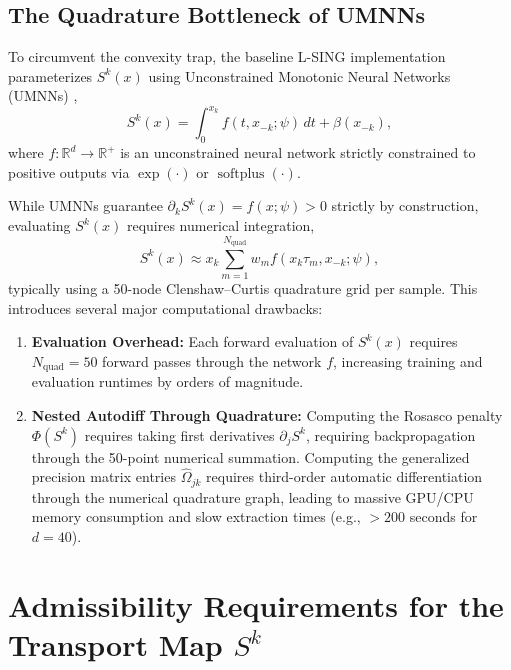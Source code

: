 \documentclass[11pt,a4paper]{article}
\theoremstyle{plain}
\theoremstyle{definition}
\theoremstyle{remark}
\begin{document}
\subsection{The Quadrature Bottleneck of UMNNs}

To circumvent the convexity trap, the baseline L-SING implementation parameterizes $S^k(x)$ using Unconstrained Monotonic Neural Networks (UMNNs) \cite{wehenkel2019unconstrained},
\begin{equation}
    S^k(x) = \int_0^{x_k} f(t, x_{-k}; \psi) \, dt + \beta(x_{-k}),
    \label{eq:umnn_def}
\end{equation}
where $f: \mathbb{R}^d \to \mathbb{R}^+$ is an unconstrained neural network strictly constrained to positive outputs via $\exp(\cdot)$ or $\operatorname{softplus}(\cdot)$.

While UMNNs guarantee $\partial_k S^k(x) = f(x; \psi) > 0$ strictly by construction, evaluating $S^k(x)$ requires numerical integration,
\begin{equation}
    S^k(x) \approx x_k \sum_{m=1}^{N_{\text{quad}}} w_m f\left( x_k \tau_m, x_{-k}; \psi \right),
\end{equation}
typically using a 50-node Clenshaw--Curtis quadrature grid per sample. This introduces several major computational drawbacks:
\begin{enumerate}
    \item \textbf{Evaluation Overhead:} Each forward evaluation of $S^k(x)$ requires $N_{\text{quad}} = 50$ forward passes through the network $f$, increasing training and evaluation runtimes by orders of magnitude.
    \item \textbf{Nested Autodiff Through Quadrature:} Computing the Rosasco penalty $\Phi(S^k)$ requires taking first derivatives $\partial_j S^k$, requiring backpropagation through the 50-point numerical summation. Computing the generalized precision matrix entries $\widehat{\Omega}_{jk}$ requires third-order automatic differentiation through the numerical quadrature graph, leading to massive GPU/CPU memory consumption and slow extraction times (e.g., $>200$ seconds for $d=40$).
\end{enumerate}

\section{Admissibility Requirements for the Transport Map \texorpdfstring{$S^k$}{S\textasciicircum k}}
\end{document}
